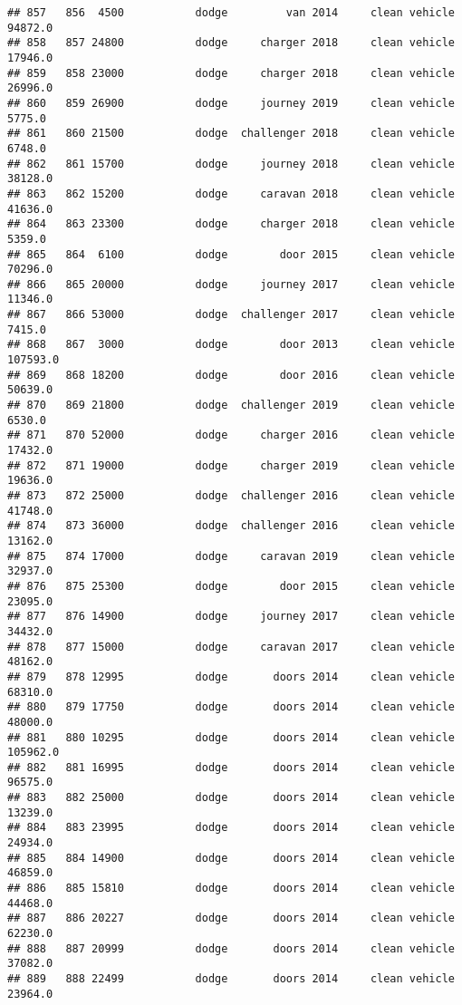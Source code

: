 \documentclass[
]{article}
\begin{document}
\begin{verbatim}
## 857   856  4500           dodge         van 2014     clean vehicle   94872.0
## 858   857 24800           dodge     charger 2018     clean vehicle   17946.0
## 859   858 23000           dodge     charger 2018     clean vehicle   26996.0
## 860   859 26900           dodge     journey 2019     clean vehicle    5775.0
## 861   860 21500           dodge  challenger 2018     clean vehicle    6748.0
## 862   861 15700           dodge     journey 2018     clean vehicle   38128.0
## 863   862 15200           dodge     caravan 2018     clean vehicle   41636.0
## 864   863 23300           dodge     charger 2018     clean vehicle    5359.0
## 865   864  6100           dodge        door 2015     clean vehicle   70296.0
## 866   865 20000           dodge     journey 2017     clean vehicle   11346.0
## 867   866 53000           dodge  challenger 2017     clean vehicle    7415.0
## 868   867  3000           dodge        door 2013     clean vehicle  107593.0
## 869   868 18200           dodge        door 2016     clean vehicle   50639.0
## 870   869 21800           dodge  challenger 2019     clean vehicle    6530.0
## 871   870 52000           dodge     charger 2016     clean vehicle   17432.0
## 872   871 19000           dodge     charger 2019     clean vehicle   19636.0
## 873   872 25000           dodge  challenger 2016     clean vehicle   41748.0
## 874   873 36000           dodge  challenger 2016     clean vehicle   13162.0
## 875   874 17000           dodge     caravan 2019     clean vehicle   32937.0
## 876   875 25300           dodge        door 2015     clean vehicle   23095.0
## 877   876 14900           dodge     journey 2017     clean vehicle   34432.0
## 878   877 15000           dodge     caravan 2017     clean vehicle   48162.0
## 879   878 12995           dodge       doors 2014     clean vehicle   68310.0
## 880   879 17750           dodge       doors 2014     clean vehicle   48000.0
## 881   880 10295           dodge       doors 2014     clean vehicle  105962.0
## 882   881 16995           dodge       doors 2014     clean vehicle   96575.0
## 883   882 25000           dodge       doors 2014     clean vehicle   13239.0
## 884   883 23995           dodge       doors 2014     clean vehicle   24934.0
## 885   884 14900           dodge       doors 2014     clean vehicle   46859.0
## 886   885 15810           dodge       doors 2014     clean vehicle   44468.0
## 887   886 20227           dodge       doors 2014     clean vehicle   62230.0
## 888   887 20999           dodge       doors 2014     clean vehicle   37082.0
## 889   888 22499           dodge       doors 2014     clean vehicle   23964.0

\end{verbatim}
\end{document}
